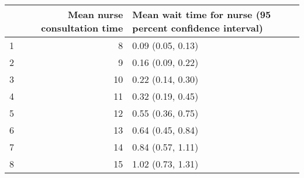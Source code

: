 \begin{table}[ht]
\centering
\begin{tabular}{rrl}
  \hline
 & Mean nurse consultation time & Mean wait time for nurse (95 percent confidence interval) \\ 
  \hline
1 &   8 & 0.09 (0.05, 0.13) \\ 
  2 &   9 & 0.16 (0.09, 0.22) \\ 
  3 &  10 & 0.22 (0.14, 0.30) \\ 
  4 &  11 & 0.32 (0.19, 0.45) \\ 
  5 &  12 & 0.55 (0.36, 0.75) \\ 
  6 &  13 & 0.64 (0.45, 0.84) \\ 
  7 &  14 & 0.84 (0.57, 1.11) \\ 
  8 &  15 & 1.02 (0.73, 1.31) \\ 
   \hline
\end{tabular}
\end{table}
